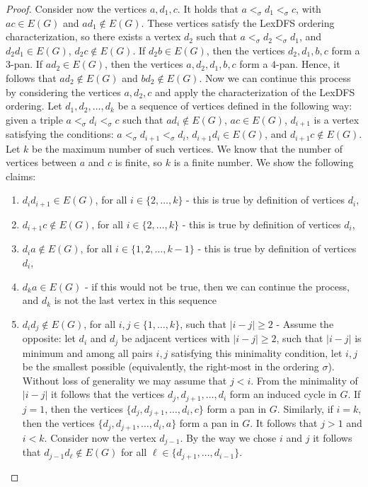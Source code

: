 \documentclass{svproc}
\begin{document}
\begin{proof}
Consider now the vertices $a,d_1,c$. It holds that $a<_\sigma d_1<_\sigma c$, with $ac\in E(G)$ and $ad_1\notin E(G)$. These vertices satisfy the LexDFS ordering characterization, so there exists a vertex $d_2$ such that $a<_\sigma d_2<_\sigma d_1$, and $d_2d_1\in E(G)$, $d_2c\notin E(G)$. If $d_2b\in E(G)$, then the vertices $d_2,d_1,b,c$ form a $3$-pan. If $ad_2\in E(G)$, then the vertices $a,d_2,d_1,b,c$ form a $4$-pan. Hence, it follows that $ad_2\notin E(G)$ and $bd_2\notin E(G)$. Now we can continue this process by considering the vertices $a,d_2,c$ and apply the characterization of the LexDFS ordering. Let $d_1,d_2,\dots, d_k$ be a sequence of vertices defined in the following way: given a triple $a<_\sigma d_i<_\sigma c$ such that $ad_i\notin E(G)$, $ac\in E(G)$, $d_{i+1}$ is a vertex satisfying the conditions: $a<_\sigma d_{i+1}<_\sigma d_i$, $d_{i+1}d_i\in E(G)$, and $d_{i+1}c\notin E(G)$. Let $k$ be the maximum number of such vertices. We know that the number of vertices between $a$ and $c$ is finite, so $k$ is a finite number. We show the following claims:
\begin{enumerate}[nosep, label = \roman*)]
\item $d_id_{i+1}\in E(G)$, for all $i\in \{2,\dots, k\}$ - this is true by definition of vertices $d_i$, 
\item $d_{i+1}c\notin E(G)$, for all $i\in \{2,\dots, k\}$ - this is true by definition of vertices $d_i$,
\item $d_{i}a\notin E(G)$, for all $i\in \{1,2,\dots, k-1\}$ - this is true by definition of vertices $d_i$,
\item $d_ka\in E(G)$ - if this would not be true, then we can continue the process, and $d_k$ is not the last vertex in this sequence
\item $d_id_j\notin E(G)$, for all $i,j\in \{1,\dots, k\}$, such that $|i-j|\ge 2$ - Assume the opposite: let $d_i$ and $d_j$ be adjacent vertices with $|i-j|\ge 2$, such that $|i-j|$ is minimum and among all pairs $i,j$ satisfying this minimality condition, let $i,j$ be the smallest possible (equivalently, the right-most in the ordering $\sigma $). Without loss of generality we may assume that $j<i$. From the minimality of $|i-j|$ it follows that the vertices $d_j,d_{j+1}, \dots, d_{i}$ form an induced cycle in $G$. If $j=1$, then the vertices $\{d_j,d_{j+1}, \dots, d_{i}, c\}$ form a pan in $G$. Similarly, if $i=k$, then the vertices $\{d_j,d_{j+1}, \dots, d_{i}, a\}$ form a pan in $G$. It follows that $j>1$ and $i<k$. Consider now the vertex $d_{j-1}$. By the way we chose $i$ and $j$ it follows that $d_{j-1}d_\ell\notin E(G)$ for all $\ell\in\{d_{j+1},\dots, d_{i-1}\}$.

\end{enumerate}
\end{proof}
\end{document}
